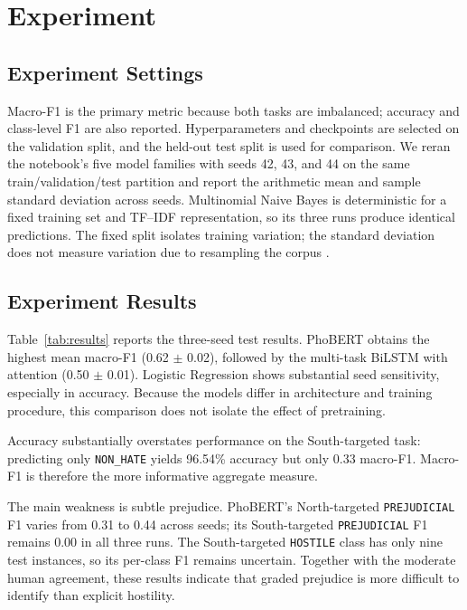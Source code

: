\documentclass[11pt]{article}
\begin{document}
\section{Experiment}

\subsection{Experiment Settings}

Macro-F1 is the primary metric because both tasks are imbalanced; accuracy and class-level F1 are also reported. Hyperparameters and checkpoints are selected on the validation split, and the held-out test split is used for comparison. We reran the notebook's five model families with seeds 42, 43, and 44 on the same train/validation/test partition and report the arithmetic mean and sample standard deviation across seeds. Multinomial Naive Bayes is deterministic for a fixed training set and TF--IDF representation, so its three runs produce identical predictions. The fixed split isolates training variation; the standard deviation does not measure variation due to resampling the corpus \cite{dodge2019show}.

\subsection{Experiment Results}

Table~\ref{tab:results} reports the three-seed test results. PhoBERT obtains the highest mean macro-F1 (0.62 $\pm$ 0.02), followed by the multi-task BiLSTM with attention (0.50 $\pm$ 0.01). Logistic Regression shows substantial seed sensitivity, especially in accuracy. Because the models differ in architecture and training procedure, this comparison does not isolate the effect of pretraining.

Accuracy substantially overstates performance on the South-targeted task: predicting only \texttt{NON\_HATE} yields 96.54\% accuracy but only 0.33 macro-F1. Macro-F1 is therefore the more informative aggregate measure.

The main weakness is subtle prejudice. PhoBERT's North-targeted \texttt{PREJUDICIAL} F1 varies from 0.31 to 0.44 across seeds; its South-targeted \texttt{PREJUDICIAL} F1 remains 0.00 in all three runs. The South-targeted \texttt{HOSTILE} class has only nine test instances, so its per-class F1 remains uncertain. Together with the moderate human agreement, these results indicate that graded prejudice is more difficult to identify than explicit hostility.
\end{document}
